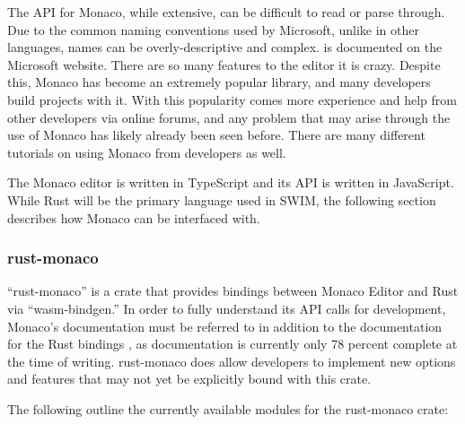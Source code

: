 \documentclass[
    paper=letter,
    parskip=half,
    fontsize=12pt,
    titlepage=firstiscover,
    toc=bibliography,
    numbers=endperiod
]{scrartcl}
\begin{document}
The API for Monaco, while extensive, can be difficult to read or parse
through. Due to the common naming conventions used by Microsoft, unlike
in other languages, names can be overly-descriptive and complex. is
documented on the Microsoft website.
There are so many features to the
editor it is crazy. Despite this, Monaco has become an extremely popular
library, and many developers build projects with it. With this
popularity comes more experience and help from other developers via
online forums, and any problem that may arise through the use of Monaco
has likely already been seen before. There are many different tutorials
on using Monaco from developers as well.

The Monaco editor is written in TypeScript and its API is written in
JavaScript. While Rust will be the primary language used in SWIM, the
following section describes how Monaco can be interfaced with.

\subsubsection{rust-monaco}

``rust-monaco'' \cite{rust-monaco} is a crate that provides bindings between Monaco Editor
and Rust via ``wasm-bindgen.'' In order to fully understand its API
calls for development, Monaco's documentation must be referred to in
addition to the documentation for the Rust bindings \cite{rust-monaco-docs}, as documentation is
currently only 78 percent complete at the time of writing. rust-monaco
does allow developers to implement new options and features that may not
yet be explicitly bound with this crate.

The following outline the currently available modules for the
rust-monaco crate:
\end{document}
